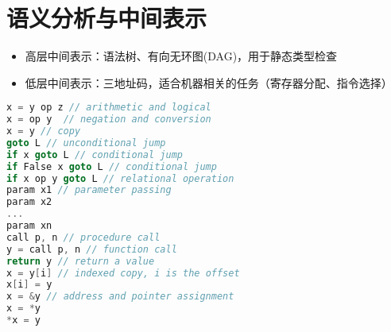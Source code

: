
\section{语义分析与中间表示}
\begin{itemize}
\item 高层中间表示：语法树、有向无环图(DAG)，用于静态类型检查
\item 低层中间表示：三地址码，适合机器相关的任务（寄存器分配、指令选择）
\end{itemize}
\begin{lstlisting}[language=c++]
x = y op z // arithmetic and logical
x = op y  // negation and conversion
x = y // copy
goto L // unconditional jump
if x goto L // conditional jump 
if False x goto L // conditional jump
if x op y goto L // relational operation
param x1 // parameter passing
param x2
...
param xn
call p, n // procedure call
y = call p, n // function call
return y // return a value
x = y[i] // indexed copy, i is the offset
x[i] = y
x = &y // address and pointer assignment
x = *y
*x = y
\end{lstlisting}

